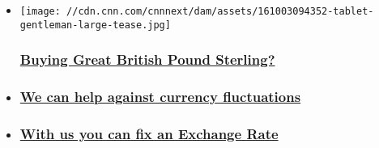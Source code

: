 \begin{itemize}
\item
  \href{https://cnnmoneytransfers.com/?utm_source=cnni\&utm_medium=belowfoldpz\&utm_term=pz3\&utm_campaign=campaign2}{}

  \texttt{[image: //cdn.cnn.com/cnnnext/dam/assets/161003094352-tablet-gentleman-large-tease.jpg]}

  \hypertarget{buying-great-british-pound-sterling}{%
  \subsubsection{\texorpdfstring{\href{https://cnnmoneytransfers.com/?utm_source=cnni\&utm_medium=belowfoldpz\&utm_term=pz3\&utm_campaign=campaign2}{Buying
  Great British Pound
  Sterling?}}{Buying Great British Pound Sterling?}}\label{buying-great-british-pound-sterling}}
\item
  \hypertarget{we-can-help-against-currency-fluctuations}{%
  \subsubsection{\texorpdfstring{\href{https://cnnmoneytransfers.com/our-services/?utm_source=cnni\&utm_medium=belowfoldpz\&utm_term=pz3\&utm_campaign=campaign3}{We
  can help against currency
  fluctuations}}{We can help against currency fluctuations}}\label{we-can-help-against-currency-fluctuations}}
\item
  \hypertarget{with-us-you-can-fix-an-exchange-rate}{%
  \subsubsection{\texorpdfstring{\href{https://cnnmoneytransfers.com/our-services/?utm_source=cnni\&utm_medium=belowfoldpz\&utm_term=pz3\&utm_campaign=campaign4}{With
  us you can fix an Exchange
  Rate}}{With us you can fix an Exchange Rate}}\label{with-us-you-can-fix-an-exchange-rate}}
\end{itemize}

